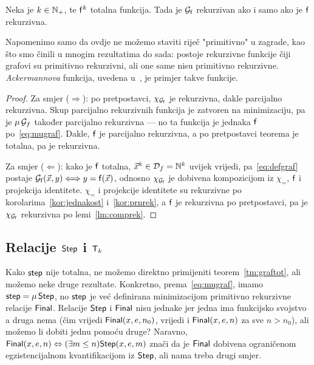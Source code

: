 \begin{teorem}\label{tm:graftot}
Neka je $k\in{\mathbb N}_+$, te $\mathsf{f}^k$ totalna funkcija. Tada je $\mathcal G_{\mathsf f}$ rekurzivan ako i samo ako je $\mathsf f$ rekurzivna.
\end{teorem}
Napomenimo samo da ovdje ne možemo staviti riječ "primitivno" u zagrade, kao što smo činili u mnogim rezultatima do sada: postoje rekurzivne funkcije čiji grafovi su primitivno rekurzivni, ali one same nisu primitivno rekurzivne. \emph{Ackermannova} funkcija, uvedena u~\cite[dodatak]{skr:Vuk}, je primjer takve funkcije.
\begin{proof}
Za smjer ($\Rightarrow$): po pretpostavci, $\chi_{\mathcal G_{\mathsf f}}$ je rekurzivna, dakle parcijalno rekurzivna. Skup parcijalno rekurzivnih funkcija je zatvoren na minimizaciju, pa je $\mu\,\mathcal G_{f}$ također parcijalno rekurzivna --- no ta funkcija je jednaka $\mathsf f$ po~\eqref{eq:mugraf}. Dakle, $\mathsf f$ je parcijalno rekurzivna, a po pretpostavci teorema je totalna, pa je rekurzivna.

Za smjer ($\Leftarrow$): kako je $\mathsf f$ totalna, $\vec x^k\in\mathcal D_{f}={\mathbb N}^k$ uvijek vrijedi, pa~\eqref{eq:defgraf} postaje $\mathcal G_{\mathsf f}(\vec x,y)\Longleftrightarrow y=\mathsf f(\vec x)$, odnosno $\chi_{\mathcal G_{\mathsf f}}$ je dobivena kompozicijom iz $\chi_=$, $\mathsf f$ i projekcija identitete. $\chi_=$ i projekcije identitete su rekurzivne po korolarima~\ref{kor:jednakost} i~\ref{kor:prnrek}, a $\mathsf f$ je rekurzivna po pretpostavci, pa je $\chi_{\mathcal G_{\mathsf f}}$ rekurzivna po lemi~\ref{lm:comprek}.
\end{proof}

\subsection{Relacije \texorpdfstring{$\mathsf{Step}$ i $\mathsf T_k$}{Step i Tk}}

Kako $\mathsf{step}$ nije totalna, ne možemo direktno primijeniti teorem~\ref{tm:graftot}, ali možemo neke druge rezultate. Konkretno, prema~\eqref{eq:mugraf}, imamo $\mathsf{step}=\mu\,\mathsf{Step}$, no $\mathsf{step}$ je već definirana minimizacijom primitivno rekurzivne relacije $\mathsf{Final}$. Relacije $\mathsf{Step}$ i $\mathsf{Final}$ nisu jednake jer jedna ima funkcijsko svojstvo a druga nema (čim vrijedi $\mathsf{Final}(x,e,n_0)$, vrijedi i $\mathsf{Final}(x,e,n)$ za sve $n>n_0$), ali možemo li dobiti jednu pomoću druge? Naravno, $\mathsf{Final}(x,e,n)\Leftrightarrow(\exists m\le n)\mathsf{Step}(x,e,m)$ znači da je $\mathsf{Final}$ dobivena ograničenom egzistencijalnom kvantifikacijom iz $\mathsf{Step}$, ali nama treba drugi smjer.

